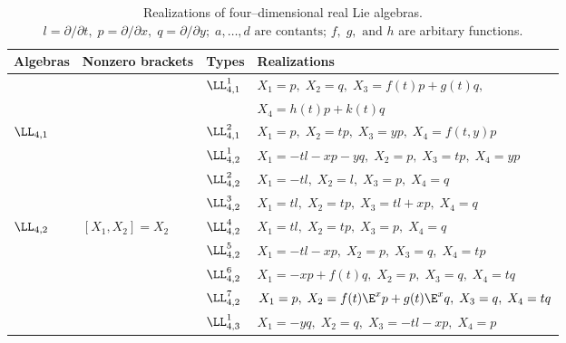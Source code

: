 %

\begin{table}
\label{t3}
\caption{Realizations of four--dimensional real Lie algebras.{\protect \\}
$l=\partial/\partial t,\;p=\partial/\partial x,\;q=\partial/\partial y;\;
a,\dots,d \mbox{ are contants; }f,\;g,\mbox{ and } h$ are arbitary functions.}
\begin{center}
\begin{tabular}{|l|l|l|l|}
\hline
Algebras  & Nonzero brackets & Types & Realizations\\ 
\hline
& & $\LL_{4,1}^1$ & $X_1=p,\;X_2=q,\;X_3=f(t)p+g(t)q,$\\ 
&  &  &               $X_4=h(t)p+k(t)q$\\
\cline{3-4}
$\LL_{4,1}$ &   & $\LL_{4,1}^2$ & $X_1=p,\;X_2=tp,\;  
                                    X_3=yp,\;X_4=f(t,y)p$\\
\hline
   &   & $\LL_{4,2}^1$ & $X_1=-tl-xp-yq,\;X_2=p,\;X_3=tp,\;X_4=yp$\\
\cline{3-4}
 &   & $\LL_{4,2}^2$ & $X_1=-tl,\;X_2=l,\;X_3=p,\;X_4=q$\\
\cline{3-4}
 &  & $\LL_{4,2}^3$ & $X_1=tl,\;X_2=tp,\;X_3=tl+xp,\;
                            X_4=q$\\
\cline{3-4}
$\LL_{4,2}$ & $[X_1,X_2]=X_2$ & $\LL_{4,2}^4$ &
                     $X_1=tl,\;X_2=tp,\;X_3=p,\;X_4=q$\\
\cline{3-4}
 & &$\LL_{4,2}^5$ & $X_1=-tl-xp,\;X_2=p,\;X_3=q,\;X_4=tp$\\
\cline{3-4}
& & $\LL_{4,2}^6$ & $X_1=-xp+f(t)q,\;X_2=p,\;X_3=q,\;X_4=tq$\\
\cline{3-4}
& & $\LL_{4,2}^7$ & $X_1=p,\;X_2=f(t)\E^xp+g(t)\E^x q,\;X_3=q,\;X_4=tq$\\
\hline
 &  & $\LL_{4,3}^1$ & $X_1=-yq,\;X_2=q,\;
                                X_3=-tl-xp,\;X_4=p$\\

\end{tabular}
\end{center}
\end{table}
